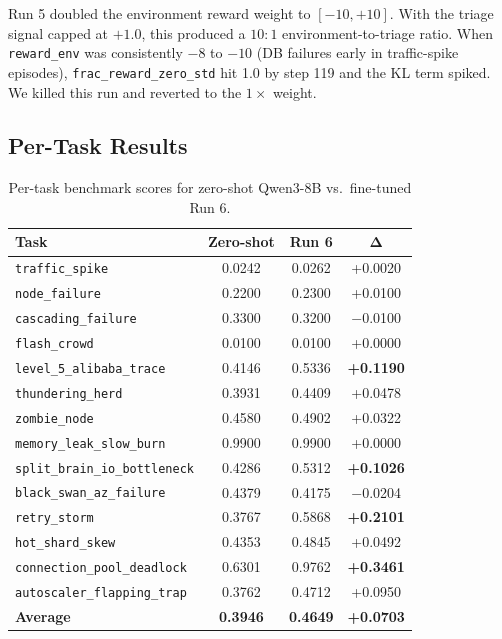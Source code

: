 \documentclass{article}
\begin{document}
Run 5 doubled the environment reward weight to $[-10, +10]$. With the triage signal
capped at $+1.0$, this produced a $10:1$ environment-to-triage ratio. When
\texttt{reward\_env} was consistently $-8$ to $-10$ (DB failures early in
traffic-spike episodes), \texttt{frac\_reward\_zero\_std} hit 1.0 by step 119 and the
KL term spiked. We killed this run and reverted to the $1\times$ weight.

\subsection{Per-Task Results}

\begin{table}[h]
\centering
\begin{tabular}{lccc}
\toprule
\textbf{Task} & \textbf{Zero-shot} & \textbf{Run 6} & $\boldsymbol{\Delta}$ \\
\midrule
\texttt{traffic\_spike} & 0.0242 & 0.0262 & +0.0020 \\
\texttt{node\_failure} & 0.2200 & 0.2300 & +0.0100 \\
\texttt{cascading\_failure} & 0.3300 & 0.3200 & $-$0.0100 \\
\texttt{flash\_crowd} & 0.0100 & 0.0100 & +0.0000 \\
\texttt{level\_5\_alibaba\_trace} & 0.4146 & 0.5336 & \textbf{+0.1190} \\
\texttt{thundering\_herd} & 0.3931 & 0.4409 & +0.0478 \\
\texttt{zombie\_node} & 0.4580 & 0.4902 & +0.0322 \\
\texttt{memory\_leak\_slow\_burn} & 0.9900 & 0.9900 & +0.0000 \\
\texttt{split\_brain\_io\_bottleneck} & 0.4286 & 0.5312 & \textbf{+0.1026} \\
\texttt{black\_swan\_az\_failure} & 0.4379 & 0.4175 & $-$0.0204 \\
\texttt{retry\_storm} & 0.3767 & 0.5868 & \textbf{+0.2101} \\
\texttt{hot\_shard\_skew} & 0.4353 & 0.4845 & +0.0492 \\
\texttt{connection\_pool\_deadlock} & 0.6301 & 0.9762 & \textbf{+0.3461} \\
\texttt{autoscaler\_flapping\_trap} & 0.3762 & 0.4712 & +0.0950 \\
\midrule
\textbf{Average} & \textbf{0.3946} & \textbf{0.4649} & \textbf{+0.0703} \\
\bottomrule
\end{tabular}
\caption{Per-task benchmark scores for zero-shot Qwen3-8B vs.\ fine-tuned Run 6.}
\end{table}
\end{document}
